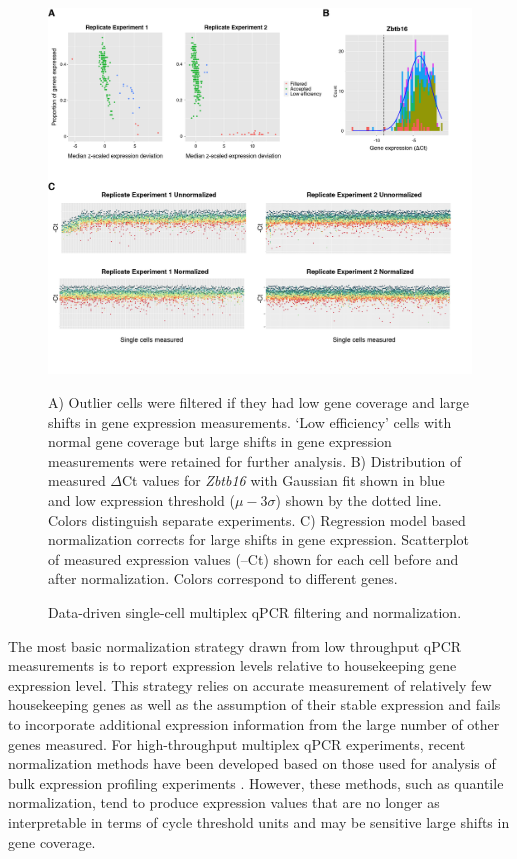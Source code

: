 \begin{subappendices}
\begin{figure}[p]
	\includegraphics[width=\textwidth]{figures/appendix/Appendix_1_filtering_normalization}
	\caption{Data-driven single-cell multiplex qPCR filtering and normalization.} 
	A) Outlier cells were filtered if they had low gene coverage and large shifts in gene expression measurements. ‘Low efficiency’ cells with normal gene coverage but large shifts in gene expression measurements were retained for further analysis. B) Distribution of measured $\Delta$Ct values for \textit{Zbtb16} with Gaussian fit shown in blue and low expression threshold ($\mu - 3\sigma$) shown by the dotted line. Colors distinguish separate experiments. C) Regression model based normalization corrects for large shifts in gene expression. Scatterplot of measured expression values (--Ct) shown for each cell before and after normalization. Colors correspond to different genes.
	\label{fig:app_filtnorm}
\end{figure}

The most basic normalization strategy drawn from low throughput qPCR measurements is to report expression levels relative to housekeeping gene expression level. This strategy relies on accurate measurement of relatively few housekeeping genes as well as the assumption of their stable expression and fails to incorporate additional expression information from the large number of other genes measured. For high-throughput multiplex qPCR experiments, recent normalization methods have been developed based on those used for analysis of bulk expression profiling experiments \cite{mar2009}. However, these methods, such as quantile normalization, tend to produce expression values that are no longer as interpretable in terms of cycle threshold units and may be sensitive large shifts in gene coverage.


\end{subappendices}
